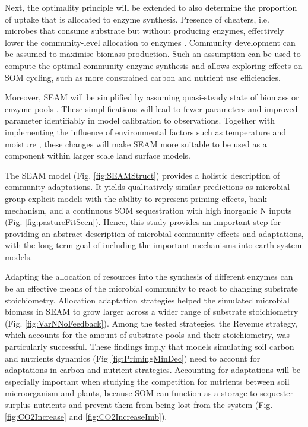 Next, the optimality principle will be extended to also determine the proportion
of uptake that is allocated to enzyme synthesis. Presence of cheaters, i.e.
microbes that consume substrate but without producing enzymes, effectively lower
the community-level allocation to enzymes \citep{Kaiser14}. Community
development can be assumed to maximise biomass production. Such an assumption
can be used to compute the optimal community enzyme synthesis and allows
exploring effects on SOM cycling, such as more constrained carbon and nutrient
use efficiencies.

Moreover, SEAM will be simplified by assuming quasi-steady state of biomass or
enzyme pools \citep{Wutzler13}. These simplifications will lead to fewer
parameters and improved parameter identifiably in model calibration to
observations.
Together with implementing the influence of environmental factors such as
temperature and moisture \citep{Davidson12}, these changes will make SEAM more
suitable to be used as a component within larger scale land surface models.
 
\conclusions
The SEAM model (Fig. \ref{fig:SEAMStruct}) provides a holistic description of
community adaptations. It yields qualitatively similar predictions as
microbial-group-explicit models with the ability to represent priming effects,
bank mechanism, and a continuous SOM sequestration with high inorganic N inputs
(Fig. \ref{fig:pastureFitScen}). Hence, this study provides an important step
for providing an abstract description of microbial community effects and
adaptations, with the long-term goal of including the important mechanisms into
earth system models.

Adapting the allocation of resources into the synthesis of different enzymes can
be an effective means of the microbial community to react to changing substrate
stoichiometry. Allocation adaptation strategies helped the simulated microbial
biomass in SEAM to grow larger across a wider range of substrate stoichiometry
(Fig. \ref{fig:VarNNoFeedback}). Among the tested strategies, the Revenue
strategy, which accounts for the amount of substrate pools and their
stoichiometry, was particularly successful.
These findings imply that models simulating soil carbon and nutrients dynamics
(Fig \ref{fig:PrimingMinDec}) need to account for adaptations in carbon and
nutrient strategies. Accounting for adaptations will be especially important
when studying the competition for nutrients between soil microorganism and
plants, because SOM can function as a storage to sequester surplus nutrients and
prevent them from being lost from the system (Fig.
\ref{fig:CO2Increase} and \ref{fig:CO2IncreaseImb}).



